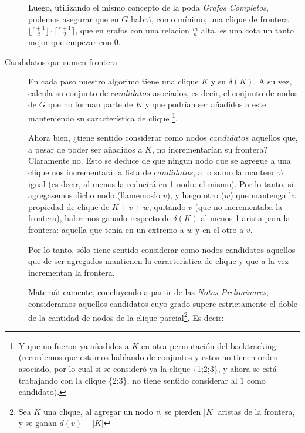 \begin{description}
            \par Luego, utilizando el mismo concepto de la poda \emph{Grafos Completos}, podemos
            asegurar que en $G$ habr\'a, como m\'inimo, una clique de frontera
            $\lfloor\frac{r+1}{2}\rfloor \cdot \lceil\frac{r+1}{2}\rceil$, que en grafos con una
            relacion $\frac{m}{n}$ alta, es una cota un tanto mejor que empezar con 0.

    \item[Candidatos que sumen frontera\label{backtracking:poda:candidatos_que_sumen}]
        En cada paso nuestro algorimo tiene
        una clique $K$ y su $\delta(K)$. A su vez, calcula su conjunto de $candidatos$
        asociados, es decir, el conjunto de nodos de $G$ que no forman parte de $K$ y
        que podr\'ian ser a\~nadidos a este manteniendo su caracter\'istica de clique%
        \footnote{Y que no fueron ya a\~nadidos a $K$ en otra permutaci\'on del backtracking
        (recordemos que estamos hablando de conjuntos y estos no tienen orden asociado, por
        lo cual si se consider\'o ya la clique \{1;2;3\}, y ahora se est\'a trabajando con
        la clique \{2;3\}, no tiene sentido considerar al $1$ como candidato).}.

        \par Ahora bien, ¿tiene sentido considerar como nodos $candidatos$ aquellos que,
            a pesar de poder ser a\~nadidos a $K$, no incrementar\'ian su frontera? Claramente
            no. Esto se deduce de que ningun nodo que se agregue a una clique nos incrementar\'a
            la lista de $candidatos$, a lo sumo la mantendr\'a igual (es decir, al menos la reducir\'a
            en 1 nodo: el mismo). Por lo tanto, si agregasemos dicho nodo (llamemoslo $v$), y
            luego otro ($w$) que mantenga la propiedad de clique de $K+v+w$,
            quitando $v$ (que no incrementaba la frontera), habremos ganado respecto de $\delta(K)$
            al menos 1 arista para la frontera: aquella que ten\'ia en un extremo a $w$ y en
            el otro a $v$.

        \par Por lo tanto, s\'olo tiene sentido considerar como nodos candidatos aquellos que
            de ser agregados mantienen la caracter\'istica de clique y que a la vez incrementan
            la frontera.

        \par Matem\'aticamente, concluyendo a partir de las \emph{Notas Preliminares}, consideramos
            aquellos candidatos cuyo grado supere estrictamente el doble de la cantidad
            de nodos de la clique parcial\footnote{Sea $K$ una clique, al agregar un nodo $v$, se pierden
            $|K|$ aristas de la frontera, y se ganan $d(v) - |K|$}. Es decir:


\end{description}
